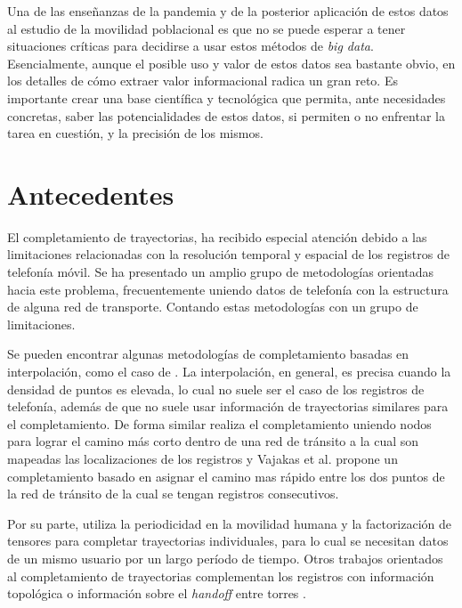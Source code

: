 Una de las enseñanzas de la pandemia y de la posterior aplicación de estos datos al estudio de la movilidad poblacional es que no se puede esperar a tener situaciones críticas para decidirse a usar estos métodos de \textit{big data}. Esencialmente, aunque el posible uso y valor de estos datos sea bastante obvio, en los detalles de cómo extraer valor informacional radica un gran reto. Es importante crear una base científica y tecnológica que permita, ante necesidades concretas, saber las potencialidades de estos datos, si permiten o no enfrentar la tarea en cuestión, y la precisión de los mismos.

\section{Antecedentes}

El completamiento de trayectorias, ha recibido especial atención debido a las limitaciones relacionadas con la resolución temporal y espacial de los registros de telefonía móvil. Se ha presentado un amplio grupo de metodologías orientadas hacia este problema, frecuentemente uniendo datos de telefonía con la estructura de alguna red de transporte. Contando estas metodologías con un grupo de limitaciones.

Se pueden encontrar algunas metodologías de completamiento basadas en interpolación, como el caso de \cite{hoteit2014estimating}. La interpolación, en general, es precisa cuando la densidad de puntos es elevada, lo cual no suele ser el caso de los registros de telefonía, además de que no suele usar información de trayectorias similares para el completamiento. De forma similar \cite{st2014reconstructing} realiza el completamiento uniendo nodos para lograr el camino más corto dentro de una red de tránsito a la cual son mapeadas las localizaciones de los registros y Vajakas et al. \cite{vajakas2015trajectory} propone un completamiento basado en asignar el camino mas rápido entre los dos puntos de la red de tránsito de la cual se tengan registros consecutivos.

Por su parte, \cite{chen2019complete} utiliza la periodicidad en la movilidad humana y la factorización de tensores para completar trayectorias individuales, para lo cual se necesitan datos de un mismo usuario por un largo período de tiempo. Otros trabajos orientados al completamiento de trayectorias complementan los registros con información topológica \cite{forghani2020cellular} o información sobre el \textit{handoff} entre torres \cite{derrmann2019road}.


